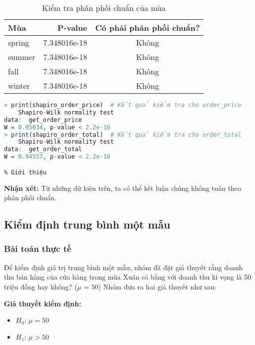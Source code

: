 \begin{table}[H]
\centering
\begin{tabular}{|l|r|c|} %
\hline
\textbf{Mùa} & \textbf{P-value}       & \textbf{Có phải phân phối chuẩn?} \\ \hline
spring          & 7.348016e-18          & Không                        \\ \hline
summer          & 7.348016e-18          & Không                        \\ \hline
fall            & 7.348016e-18          & Không                        \\ \hline
winter          & 7.348016e-18          & Không                        \\ \hline
\end{tabular}
\caption{Kiểm tra phân phối chuẩn của mùa}
\label{tab:normality_results}
\end{table}
\begin{lstlisting}[language=R,caption=Hai cột còn lại]
> print(shapiro_order_price)  # Kết quả kiểm tra cho order_price
	Shapiro-Wilk normality test
data:  get_order_price
W = 0.95034, p-value < 2.2e-16
> print(shapiro_order_total)  # Kết quả kiểm tra cho order_total
	Shapiro-Wilk normality test
data:  get_order_total
W = 0.94557, p-value < 2.2e-16

% Giới thiệu

\end{lstlisting}
\begin{boxH}
    \textbf{Nhận xét:} Từ những dữ kiện trên, ta có thể kết luận chúng không tuân theo phân phối chuẩn.
\end{boxH}
\subsection{Kiểm định trung bình một mẫu}
\subsubsection{Bài toán thực tế}
Để kiểm định giá trị trung bình một mẫu, nhóm đã đặt giả thuyết rằng doanh thu bán hàng của cửa hàng trong mùa Xuân có bằng với doanh thu kì vọng là 50 triệu đồng hay không? ($\mu$ = $50$)  
Nhóm đưa ra hai giả thuyết như sau:

\textbf{Giả thuyết kiểm định:}
\begin{itemize}
    \item \( H_0 \): \( \mu = 50 \) 
    \item \( H_1 \): \( \mu > 50 \) 
\end{itemize}

